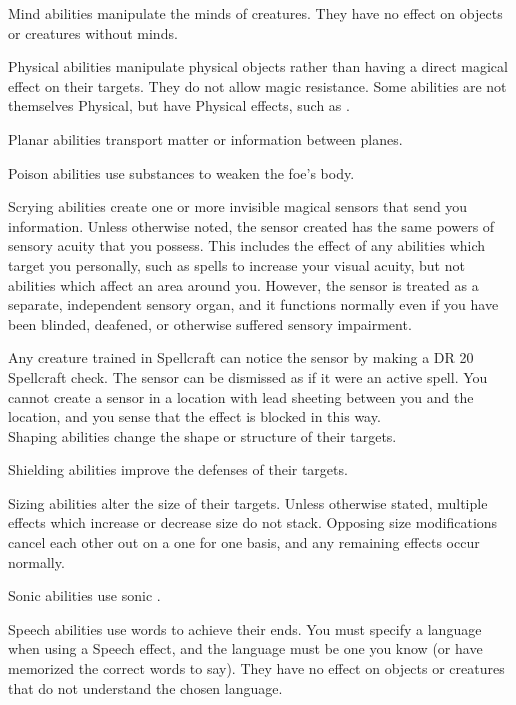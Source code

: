      Mind abilities manipulate the minds of creatures.
    They have no effect on objects or creatures without minds.

     Physical abilities manipulate physical objects rather than having a direct magical effect on their targets.
    They do not allow magic resistance.
    Some abilities are not themselves Physical, but have Physical effects, such as .

     Planar abilities transport matter or information between planes.

     Poison abilities use substances to weaken the foe's body.

     Scrying abilities create one or more invisible magical sensors that send you information.
    Unless otherwise noted, the sensor created has the same powers of sensory acuity that you possess.
    This includes the effect of any abilities which target you personally, such as spells to increase your visual acuity, but not abilities which affect an area around you.
    However, the sensor is treated as a separate, independent sensory organ, and it functions normally even if you have been blinded, deafened, or otherwise suffered sensory impairment.
    \par Any creature trained in Spellcraft can notice the sensor by making a DR 20 Spellcraft check.
    The sensor can be dismissed as if it were an active spell.
    You cannot create a sensor in a location with lead sheeting between you and the location, and you sense that the effect is blocked in this way.
    \\

     Shaping abilities change the shape or structure of their targets.

     Shielding abilities improve the defenses of their targets.

     Sizing abilities alter the size of their targets.
    Unless otherwise stated, multiple effects which increase or decrease size do not stack.
    Opposing size modifications cancel each other out on a one for one basis, and any remaining effects occur normally.

     Sonic abilities use sonic .

     Speech abilities use words to achieve their ends.
    You must specify a language when using a Speech effect, and the language must be one you know (or have memorized the correct words to say). They have no effect on objects or creatures that do not understand the chosen language.

